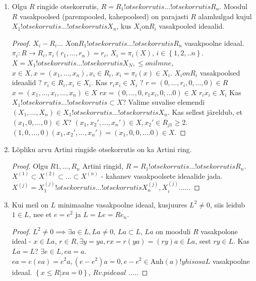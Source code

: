 \documentclass[12pt]{report}
\numberwithin{equation}{section}
\theoremstyle{definition}
\theoremstyle{plain}
\begin{document}
\begin{enumerate}
\begin{proof}
$m \in M_i, 0 = rm  = (r1,...,rn)m = r_im \implies r=0$
\end{proof}
\item Olgu $R$ ringide otsekorrutis, $R = R_1 !otsekorrutis ... !otsekorrutis R_n$. Moodul $R$ vasakpoolsed (parempooled, kahepoolsed) on parajasti $R$ alamhulgad kujul $X_1 !otsekorrutis ... !otsekorrutis X_n$, kus $X_i \text{on} R_i$ vasakpooled ideaalid.
\begin{proof}
$X_i -R_i ... $
$X \text{on} R_1 !otsekorrutis ... !otsekorrutis R_n$ vasakpoolne ideaal.
$\pi_{i} : R \to R_i, \pi_i(r_1,...,r_n) = r_i$, 
$X_i = \pi_i(X)$, $i \in \left\lbrace 1, 2, ..n \right\rbrace$.
$X = X_1 !otsekorrutis ... !otsekorrutis X_N, \leq on ilmne$, $x \in X, x = (x_1,...,x_n), x_i \in R_i$, $x_i = \pi_i(x) \in X_i$.
$X_i on R_i$ vasakpoolsed ideaalid ?
$r_i \in R_i, x_i \in X_i$. Kas $r_i x_i \in X_i$ ?
$ r = (0,...,r_i,0,...,0) \in R$
$ x = (x_1,...,x_i, ..., x_n) \in X$
$rx = (0,...,0,r_1x_i,0,...0) \in X$
$r_{i}x_{i} \in X_i$
Kas $X_1 !otsekorrutis ... !otsekorrutis \subset X$? Valime suvalise elemendi $(X_1,...,X_n) \in X_1 !otsekorrutis ... !otsekorrutis X_n$. Kas sellest järeldub, et $ (x_1,0,...,0) \in X$?
$(x_1,x_{2}',...,x_{n}') \in X, x_{2}' \in R_{j1} \geq 2$.
$(1,0,...,0)(x_1,x_{2}',...,x_{n}') = (x_1,0,0,....0) \in X$.
\end{proof}
\item Lõpliku arvu Artini ringide otsekorrutis on ka Artini ring.
\begin{proof}
Olgu $R1,...,R_n$ Artini ringid, $R = R_1 !otsekorrutis ... !otsekorrutis R_n$. $X^{\left(1 \right)} \subset X^{\left( 2 \right)} \subset ... \subset X^{\left( n \right)}$ - kahanev vasakpoolsete ideaalide jada. $X^{\left(j \right)} = X^{\left(j \right)}_1 !otsekorrutis ... !otsekorrutis X^{\left(j \right)}_n, X_{i}^{\left( j \right)} ......$
\end{proof}
\item Kui meil on $L$ minimaalne vasakpoolne ideaal, kusjuures $L^2 \neq 0$, siis leidub $1 \in L$, nee et $e = e^2$ ja $L = Le = R e_{n}$.
\begin{proof}
$L^2 \neq 0 \implies \exists a \in L , La \neq 0$, $La \subset L$, $La$ on mooduli $R$ vasakpolone ideal - $x \in La$, $r \in R, \exists y = ya, rx = r(ya) = (ry)a \in La$, sest $ry \in L$. 
Kas $La = L$? $\exists e \in L, ea= a$.
$ea = e(ea) = e^2a, (e-e^2)a = 0, e-e^2 \in \text{Anh} \left( a \right) !yhisosa L$ vasakpoolne ideaal.
$\left\lbrace x \leq R | xa = 0 \right\rbrace$, $R v.p ideaal$ .....
\end{proof}

\end{enumerate}
\end{document}
